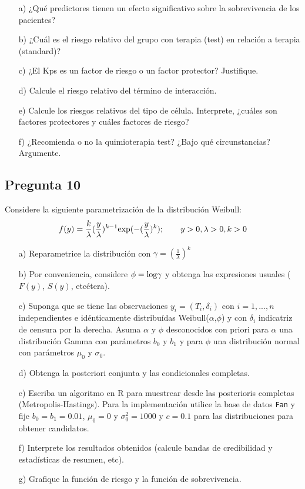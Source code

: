 \documentclass[10pt]{article}\usepackage[]{graphicx}\usepackage[]{color}
\begin{document}
\begin{itemize}
\item[a)] ¿Qué predictores tienen un efecto significativo sobre la sobrevivencia de los pacientes?
\item[b)] ¿Cuál es el riesgo relativo del grupo con terapia (test) en relación a terapia (standard)?
\item[c)] ¿El Kps es un factor de riesgo o un factor protector? Justifique.
\item[d)] Calcule el riesgo relativo del término de interacción.
\item[e)] Calcule los riesgos relativos del tipo de célula. Interprete, ¿cuáles son factores protectores y cuáles factores de riesgo?
\item[f)] ¿Recomienda o no la quimioterapia test? ¿Bajo qué circunstancias? Argumente.
\end{itemize}

\subsection*{Pregunta 10}

Considere la siguiente parametrización de la distribución Weibull: 
$$f(y)=\frac{k}{\lambda}(\frac{y}{\lambda})^{k-1}\textnormal{exp}(-(\frac{y}{\lambda})^{k}); \qquad y>0, \lambda>0, k>0$$
\begin{itemize}
\item[a)] Reparametrice la distribución con $\gamma=(\frac{1}{{\lambda}})^{k}$
\item[b)] Por conveniencia, considere $\phi=\textnormal{log}\gamma$ y obtenga las expresiones usuales ($F(y)$, $S(y)$, etcétera).
\item[c)] Suponga que se tiene las observaciones $y_{i}=(T_{i},\delta_{i})$ con $i=1,...,n$ independientes e idénticamente distribuídas Weibull($\alpha$,$\phi$) y con $\delta_{i}$ indicatriz de censura por la derecha. Asuma $\alpha$ y $\phi$ desconocidos con priori para $\alpha$ una distribución Gamma con parámetros $b_{0}$ y $b_{1}$ y para $\phi$ una distribución normal con parámetros $\mu_{0}$ y $\sigma_{0}$.
\item[d)] Obtenga la posteriori conjunta y las condicionales completas.
\item[e)] Escriba un algoritmo en R para muestrear desde las posterioris completas (Metropolis-Hastings). Para la implementación utilice la base de datos \texttt{Fan} y fije $b_{0}=b_{1}=0.01$, $\mu_{0}=0$ y $\sigma^{2}_{0}=1000$ y $c=0.1$ para las distribuciones para obtener candidatos.
\item[f)] Interprete los resultados obtenidos (calcule bandas de credibilidad y estadísticas de resumen, etc).
\item[g)] Grafique la función de riesgo y la función de sobrevivencia.

\end{itemize}
\end{document}
